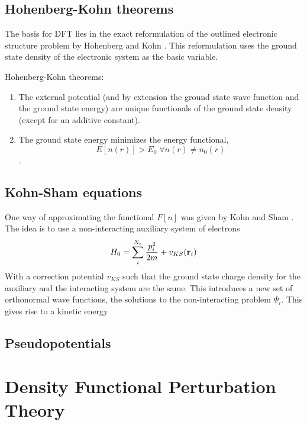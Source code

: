 \documentclass[main.tex]{subfiles}
\begin{document}
\subsection{Hohenberg-Kohn theorems}

The basis for DFT lies in the exact reformulation of the outlined electronic structure problem by Hohenberg and Kohn \cite{hohenberg_inhomogeneous_1964}.
This reformulation uses the ground state density of the electronic system as the basic variable. 

Hohenberg-Kohn theorems:

\begin{enumerate}[I]
    \item The external potential (and by extension the ground state wave function and the ground state energy) are  unique functionals of the ground state density (except for an additive constant).
    \item The ground state energy minimizes the energy functional,
    \[E[n(r)] > E_0 \;\forall n(r) \neq n_0 (r)\].
\end{enumerate}

\subsection{Kohn-Sham equations}

One way of approximating the functional \(F[n]\) was given by Kohn and Sham \cite{kohn_self-consistent_1965}.
The idea is to use a non-interacting auxiliary system of electrons 
\begin{equation}
    H_0 = \sum_i^{N_e} \frac{p_i^2}{2m} + v_{KS} (\vb{r}_i)
\end{equation}
With a correction potential \(v_{KS}\) such that the ground state charge density for the auxiliary and the interacting system are the same.
This introduces a new set of orthonormal wave functions, the solutions to the non-interacting problem \(\Psi_i\).
This gives rise to a kinetic energy 

\subsection{Pseudopotentials}

\section{Density Functional Perturbation Theory}
\end{document}
